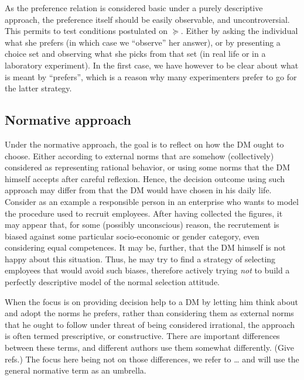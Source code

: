 \documentclass[french, english]{llncs}
\begin{document}
	As the preference relation is considered basic under a purely descriptive approach, the preference itself should be easily observable, and uncontroversial. This permits to test conditions postulated on $\succeq$. Either by asking the individual what she prefers (in which case we “observe” her answer), or by presenting a choice set and observing what she picks from that set (in real life or in a laboratory experiment). In the first case, we have however to be clear about what is meant by “prefers”, which is a reason why many experimenters prefer to go for the latter strategy.
	
	\subsection{Normative approach}
	Under the normative approach, the goal is to reflect on how the \ac{DM} ought to choose. Either according to external norms that are somehow (collectively) considered as representing rational behavior, or using some norms that the \ac{DM} himself accepts after careful reflexion. Hence, the decision outcome using such approach may differ from that the \ac{DM} would have chosen in his daily life. Consider as an example a responsible person in an enterprise who wants to model the procedure used to recruit employees. After having collected the figures, it may appear that, for some (possibly unconscious) reason, the recrutement is biased against some particular socio-economic or gender category, even considering equal competences. It may be, further, that the \ac{DM} himself is not happy about this situation. Thus, he may try to find a strategy of selecting employees that would avoid such biases, therefore actively trying \emph{not} to build a perfectly descriptive model of the normal selection attitude.
	
	When the focus is on providing decision help to a \ac{DM} by letting him think about and adopt the norms he prefers, rather than considering them as external norms that he ought to follow under threat of being considered irrational, the approach is often termed prescriptive, or constructive. There are important differences between these terms, and different authors use them somewhat differently. (Give refs.) The focus here being not on those differences, we refer to … and will use the general normative term as an umbrella.
	
\end{document}
